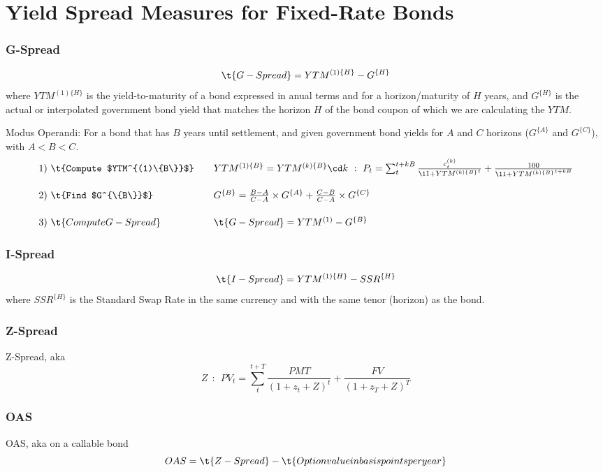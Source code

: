 \documentclass[12pt,article]{memoir}
\begin{document}
\section{Yield Spread Measures for Fixed-Rate Bonds}
\subsubsection{G-Spread}

$$
\t{G-Spread} = YTM^{(1)\{H\}}-G^{\{H\}}
$$
where $YTM^{(1)\{H\}}$ is the yield-to-maturity of a bond expressed in anual terms and for a horizon/maturity of $H$ years, and $G^{\{H\}}$ is the actual or interpolated government bond yield that matches the horizon $H$ of the bond coupon of which we are calculating the $YTM$. 

Modus Operandi: For a bond that has $B$ years until settlement, and given government bond yields for $A$ and $C$ horizons ($G^{\{A\}}$ and $G^{\{C\}}$), with $A<B<C$.
$$\begin{array}{lllll}
1)~\t{Compute  $YTM^{(1)\{B\}}$} && YTM^{(1)\{B\}}=YTM^{(k)\{B\}}\cd k~:~P_t = \sum_{t}^{t+kB} \frac{c_t^{(k)}}{\1{1+YTM^{(k)\{B\}}}^t} + \frac{100}{\1{1+YTM^{(k)\{B\}}}^{t+kB}}
\\[1.5em]
2)~\t{Find $G^{\{B\}}$} && G^{\{B\}}= \frac{B-A}{C-A} \times G^{\{A\}} +  \frac{C-B}{C-A} \times G^{\{C\}}
\\[1.5em]
3)~\t{Compute G-Spread} && \t{G-Spread} = YTM^{(1)} - G^{\{B\}}
\end{array}$$

\subsubsection{I-Spread}
$$
\t{I-Spread} = YTM^{(1)\{H\}} - SSR^{\{H\}}
$$
where $SSR^{\{H\}}$ is the Standard Swap Rate in the same currency and with the same tenor (horizon) as the bond.

\subsubsection{Z-Spread}
Z-Spread, aka 
$$
Z~~:~~ PV_t = \sum_{t}^{t+T} \frac{PMT}{(1+z_t+Z)^t} + \frac{FV}{(1+z_T+Z)^T}
$$

\subsubsection{OAS}
OAS, aka  on a callable bond
$$
OAS = \t{Z-Spread}-\t{Option value in basis points per year}
$$
\end{document}
